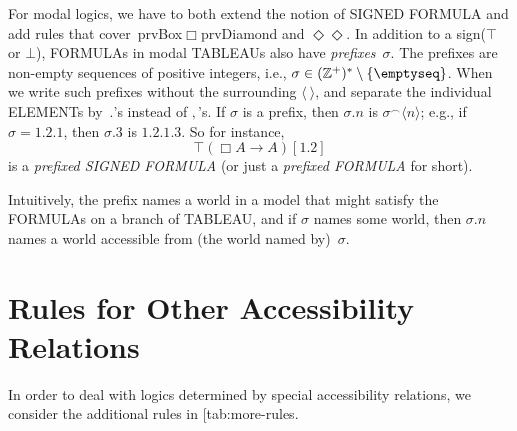 \documentclass[10pt,a4paper]{article}
\makeatletter
\newcommand*{\olup}[1]{\MakeUppercase{#1}}
\theoremstyle{plain}
\theoremstyle{definition}
\theoremstyle{remark}
\newcommand*{\olfileid}[3]{}
\newcommand*{\olsection}[1]{\section*{#1}}
\newcommand{\olref}{\@ifnextchar[{\olref@i}{\olref@final}}
\def\olref@i[#1]{\@ifnextchar[{\olref@ii}{\olref@final}}
\def\olref@ii[#1]{\@ifnextchar[{\olref@iii}{\olref@final}}
\def\olref@iii[#1]{\olref@final}
\def\olref@final#1{\ref{#1}}
\providecommand{\lif}{\mathbin{\rightarrow}}
\providecommand{\sFmla}[2]{#1(#2)}
\providecommand{\True}{\top}
\providecommand{\False}{\bot}
\providecommand{\tuple}[1]{\langle #1 \rangle}
\providecommand{\iftag}[1]{#1}
\providecommand{\PosInt}{\mathbb{Z}^{+}}
\providecommand{\concat}{\mathbin{{}^\frown}}
\providecommand{\iftag}{}
\makeatother
\begin{document}
For modal logics, we have to both extend the notion of \olup{signed
formula} and add rules that
cover~\iftag{prvBox}{$\Box$\iftag{prvDiamond}{ and
    $\Diamond$}}{$\Diamond$}. In addition to a sign($\True$ or
$\False$), \olup{formula}s in modal \olup{tableau}s also have
\emph{prefixes}~$\sigma$. The prefixes are non-empty sequences of
positive integers, i.e., $\sigma \in (\PosInt)^* \setminus
\{\emptyseq\}$. When we write such prefixes without the surrounding
$\tuple{\ }$, and separate the individual \olup{element}s by~$.$'s
instead of $,$'s. If $\sigma$ is a prefix, then $\sigma.n$ is $\sigma
\concat \tuple{n}$; e.g., if $\sigma = 1.2.1$, then $\sigma.3$ is
$1.2.1.3$. So for instance,
\[
\sFmla{\True}{\Box A \lif A}[1.2]
\]
is a \emph{prefixed \olup{signed formula}} (or just a \emph{prefixed
  \olup{formula}} for short).

Intuitively, the prefix names a world in a model that might satisfy
the \olup{formula}s on a branch of \olup{tableau}, and if $\sigma$ names
some world, then $\sigma.n$ names a world accessible from (the world
named by)~$\sigma$.





\olfileid{nml}{tab}{mru}

\olsection{Rules for Other Accessibility Relations}

In order to deal with logics determined by special accessibility
relations, we consider the additional rules in \olref{tab:more-rules}.
\end{document}
